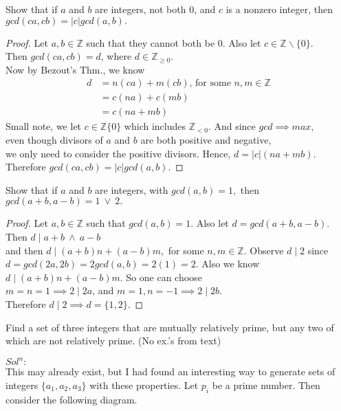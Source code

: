 \documentclass[12pt]{article}
\newcommand{\Z}{\mathbb{Z}}
\newenvironment{exercise}[2][Exercise]{\begin{trivlist}
\item[\hskip \labelsep {\bfseries #1}\hskip \labelsep {\bfseries #2.}]}{\end{trivlist}}
\begin{document}
\begin{exercise}{3.3.9} Show that if $a$ and $b$ are integers, not both 0, and $c$ is a nonzero integer, then $gcd(ca,cb)=|c|gcd(a,b).$
\end{exercise}
\begin{proof}
Let $a,b\in \Z$ such that they cannot both be 0. Also let $c\in \Z \backslash \{0\}$.\\
Then $gcd(ca,cb)=d$, where $d\in\Z_{\geq0}$. \\

\noindent Now by Bezout's Thm., we know
\begin{align*}
d&=n(ca)+m(cb)\text{, for some $n,m\in\Z$}\\
&=c(na)+c(mb)\\
&=c(na+mb)
\end{align*}
Small note, we let $c\in \Z\{0\}$
which includes $\Z_{<0}$. And since $gcd\implies max$, \\even though divisors of $a$ and $b$ are both positive and negative, \\we only need to consider the positive divisors.
Hence, $d=|c|(na+mb)$.\\

\noindent Therefore $gcd(ca,cb)=|c|gcd(a,b)$.
\end{proof}


\newpage
\begin{exercise}{3.3.10} Show that if $a$ and $b$ are integers, with $gcd(a,b)=1,$ then \\$gcd(a+b,a-b)=1 ~\lor~2.$ 
\end{exercise}
\begin{proof}
Let $a,b\in \Z$ such that $gcd(a,b)=1$. Also let $d=gcd(a+b,a-b).$\\
Then $d\mid a+b~\land~a-b$\\
and then $d\mid (a+b)n+(a-b)m,$ for some $n,m\in\Z.$
Observe $d\mid 2$ since $d=gcd(2a,2b)=2gcd(a,b)=2(1)=2$. Also we know $d\mid (a+b)n+(a-b)m$. So one can choose\\
$m=n=1 \implies 2\mid 2a$, and $m=1, n=-1\implies 2\mid 2b$.\\
Therefore $d\mid 2 \implies d=\{1,2\}.$ 
\end{proof}





\renewcommand\qedsymbol{$\square$} 
\begin{exercise}{3.3.17} Find a set of three integers that are mutually relatively prime, but any two of which are not relatively prime. (No ex.'s from text)
\end{exercise}
$Sol^n:$\\
This may already exist, but I had found an interesting way to generate sets of integers $\{a_1,a_2,a_3\}$ with these properties.
Let $p_i$ be a prime number. Then consider the following diagram. 
\end{document}
